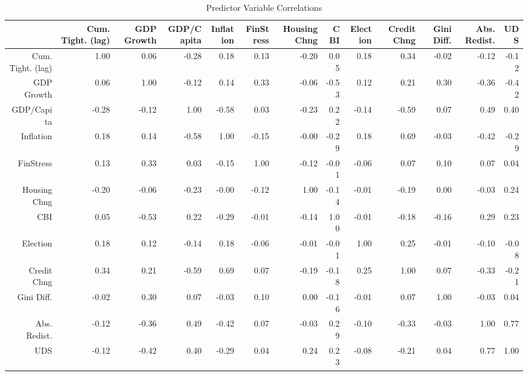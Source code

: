 \begin{table}[ht]
\centering
\caption{Predictor Variable Correlations} 
\begingroup\tiny
\begin{tabular}{rrrrrrrrrrrrr}
  \hline
 & Cum. Tight. (lag) & GDP Growth & GDP/Capita & Inflation & FinStress & Housing Chng & CBI & Election & Credit Chng & Gini Diff. & Abs. Redist. & UDS \\ 
  \hline
Cum. Tight. (lag) & 1.00 & 0.06 & -0.28 & 0.18 & 0.13 & -0.20 & 0.05 & 0.18 & 0.34 & -0.02 & -0.12 & -0.12 \\ 
  GDP Growth & 0.06 & 1.00 & -0.12 & 0.14 & 0.33 & -0.06 & -0.53 & 0.12 & 0.21 & 0.30 & -0.36 & -0.42 \\ 
  GDP/Capita & -0.28 & -0.12 & 1.00 & -0.58 & 0.03 & -0.23 & 0.22 & -0.14 & -0.59 & 0.07 & 0.49 & 0.40 \\ 
  Inflation & 0.18 & 0.14 & -0.58 & 1.00 & -0.15 & -0.00 & -0.29 & 0.18 & 0.69 & -0.03 & -0.42 & -0.29 \\ 
  FinStress & 0.13 & 0.33 & 0.03 & -0.15 & 1.00 & -0.12 & -0.01 & -0.06 & 0.07 & 0.10 & 0.07 & 0.04 \\ 
  Housing Chng & -0.20 & -0.06 & -0.23 & -0.00 & -0.12 & 1.00 & -0.14 & -0.01 & -0.19 & 0.00 & -0.03 & 0.24 \\ 
  CBI & 0.05 & -0.53 & 0.22 & -0.29 & -0.01 & -0.14 & 1.00 & -0.01 & -0.18 & -0.16 & 0.29 & 0.23 \\ 
  Election & 0.18 & 0.12 & -0.14 & 0.18 & -0.06 & -0.01 & -0.01 & 1.00 & 0.25 & -0.01 & -0.10 & -0.08 \\ 
  Credit Chng & 0.34 & 0.21 & -0.59 & 0.69 & 0.07 & -0.19 & -0.18 & 0.25 & 1.00 & 0.07 & -0.33 & -0.21 \\ 
  Gini Diff. & -0.02 & 0.30 & 0.07 & -0.03 & 0.10 & 0.00 & -0.16 & -0.01 & 0.07 & 1.00 & -0.03 & 0.04 \\ 
  Abs. Redist. & -0.12 & -0.36 & 0.49 & -0.42 & 0.07 & -0.03 & 0.29 & -0.10 & -0.33 & -0.03 & 1.00 & 0.77 \\ 
  UDS & -0.12 & -0.42 & 0.40 & -0.29 & 0.04 & 0.24 & 0.23 & -0.08 & -0.21 & 0.04 & 0.77 & 1.00 \\ 
   \hline
\end{tabular}
\endgroup
\end{table}
